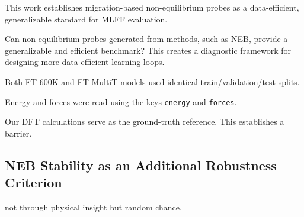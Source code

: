 \documentclass{article}
\providecommand{\reviewermap}[3]{}
\begin{document}
\reviewermap{REV-A4}{done-local}{Scope generalizable-standard language to a candidate framework demonstrated on Cr-doped Sb2Te3.}
This work establishes migration-based non-equilibrium probes as a data-efficient, generalizable standard for MLFF evaluation.
\reviewermap{REV-A4}{done-local}{Frame generalizability as an open question rather than a completed claim.}
\item Can non-equilibrium probes generated from methods, such as NEB, provide a generalizable and efficient benchmark?
This creates a diagnostic framework for designing more data-efficient learning loops.
\reviewermap{REV-A7}{done-local}{Add nearest-neighbor literature and state the delta relative to the earlier arXiv/workshop report.}
\reviewermap{REV-A2/REV-C10}{pending}{Grouped split by trajectory/pathway provenance; pending SOAP-RMSD-overlap-audit and grouped-split-retrained-rmse.}
Both FT-600K and FT-MultiT models used identical train/validation/test splits.
\reviewermap{REV-C8}{pending-release}{Confirm reported fine-tuned models used real-force AIMD frames only; pending final code-release hash for zero-force exporter fix.}
Energy and forces were read using the keys \texttt{energy} and \texttt{forces}.
\reviewermap{REV-A1}{partial}{Fig. 3d is fixed-geometry DFT-path scoring; current 1-4 DFT reference candidate is 0.336050 eV; Foundation fixed-path error is +0.688246 eV.}
Our DFT calculations serve as the ground-truth reference. This establishes a barrier.
\subsection{NEB Stability as an Additional Robustness Criterion}
\reviewermap{REV-A1}{partial}{Define Fig. 3d and SI Fig. S3 as different NEB operators and report them side-by-side.}
\reviewermap{REV-A3}{pending-cluster}{Replace unsupported chance explanation with seed-stability evidence over Scratch and FT-600K retraining seeds.}
not through physical insight but random chance.
\end{document}
